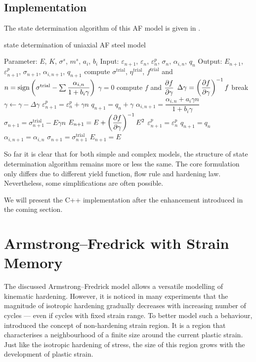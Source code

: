 \subsection{Implementation}
The state determination algorithm of this AF model is given in .
\begin{breakablealgorithm}
\caption{state determination of uniaxial AF steel model}\label{algo:af_steel}
\begin{algorithmic}[1]
\State Parameter: $E$, $K$, $\sigma^s$, $m^s$, $a_i$, $b_i$
\State Input: $\varepsilon_{n+1}$, $\varepsilon_n$, $\varepsilon^p_n$, $\sigma_n$, $\alpha_{i,n}$, $q_n$
\State Output: $E_{n+1}$, $\varepsilon^p_{n+1}$, $\sigma_{n+1}$, $\alpha_{i,n+1}$, $q_{n+1}$
\State compute $\sigma^\text{trial}$, $\eta^\text{trial}$, $f^\text{trial}$ and $n=\text{sign}\left(\sigma^\text{trial}-\sum\dfrac{\alpha_{i,n}}{1+b_i\gamma}\right)$
\State $\gamma=0$
\State compute $f$ and $\dfrac{\partial{f}}{\partial{\gamma}}$
\State $\Delta\gamma=\left(\dfrac{\partial{f}}{\partial{\gamma}}\right)^{-1}f$
\State {}
\State break
\EndIf
\State $\gamma\leftarrow\gamma-\Delta\gamma$
\EndWhile
\State $\varepsilon^p_{n+1}=\varepsilon^p_n+\gamma{}n$
\State $q_{n+1}=q_n+\gamma$
\State $\alpha_{i,n+1}=\dfrac{\alpha_{i,n}+a_i\gamma{}n}{1+b_i\gamma}$
\State $\sigma_{n+1}=\sigma_{n+1}^\text{trial}-E\gamma{}n$
\State $E_{n+1}=E+\left(\dfrac{\partial{f}}{\partial{\gamma}}\right)^{-1}E^2$
\Else
\State $\varepsilon^p_{n+1}=\varepsilon^p_n$
\State $q_{n+1}=q_n$
\State $\alpha_{i,n+1}=\alpha_{i,n}$
\State $\sigma_{n+1}=\sigma_{n+1}^\text{trial}$
\State $E_{n+1}=E$
\EndIf
\end{algorithmic}
\end{breakablealgorithm}

So far it is clear that for both simple and complex models, the structure of state determination algorithm remains more or less the same. The core formulation only differs due to different yield function, flow rule and hardening law. Nevertheless, some simplifications are often possible.

We will present the C++ implementation after the enhancement introduced in the coming section.
\section{Armstrong--Fredrick with Strain Memory}
The discussed Armstrong--Fredrick model allows a versatile modelling of kinematic hardening.
However, it is noticed in many experiments that the magnitude of isotropic hardening gradually decreases with increasing number of cycles --- even if cycles with fixed strain range.
To better model such a behaviour, \cite{Ohno1982} introduced the concept of non-hardening strain region.
It is a region that characterises a neighbourhood of a finite size around the current plastic strain. Just like the isotropic hardening of stress, the size of this region grows with the development of plastic strain.
